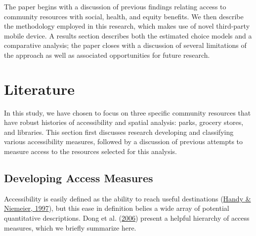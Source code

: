 \documentclass[review, 3p]{elsarticle} %
\begin{document}
The paper begins with a discussion of previous findings relating access to
community resources with social, health, and equity benefits. We then describe
the methodology employed in this research, which makes use of novel third-party
mobile device. A results section describes both the estimated choice models and
a comparative analysis; the paper closes with a discussion of several
limitations of the approach as well as associated opportunities for future research.

\hypertarget{lit-review}{%
\section{Literature}\label{lit-review}}

In this study, we have chosen to focus on three specific community resources
that have robust histories of accessibility and spatial analysis: parks, grocery
stores, and libraries. This section first discusses research developing and
classifying various accessibility measures, followed by a discussion of previous
attempts to measure access to the resources selected for this analysis.

\hypertarget{developing-access-measures}{%
\subsection{Developing Access Measures}\label{developing-access-measures}}

Accessibility is easily defined as the ability to reach useful destinations (\protect\hyperlink{ref-handy1997}{Handy \& Niemeier, 1997}),
but this ease in definition belies a wide array of potential quantitative
descriptions. Dong et al. (\protect\hyperlink{ref-dong2006}{2006}) present a helpful hierarchy of access measures, which we
briefly summarize here.
\end{document}
